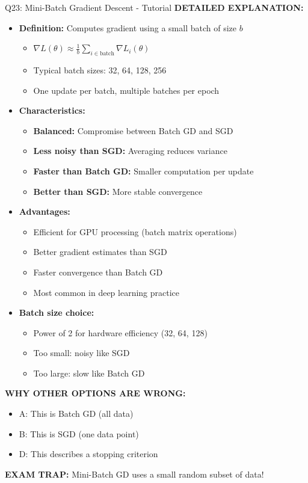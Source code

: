 \documentclass[8pt]{beamer}
\begin{document}
\begin{frame}{Q23: Mini-Batch Gradient Descent - Tutorial}
		\vspace{0.05cm}
		\textbf{DETAILED EXPLANATION:}
		\begin{itemize}
			\item \textbf{Definition:} Computes gradient using a small batch of size $b$
			\begin{itemize}
				\item $\nabla L(\theta) \approx \frac{1}{b}\sum_{i \in \text{batch}} \nabla L_i(\theta)$
				\item Typical batch sizes: 32, 64, 128, 256
				\item One update per batch, multiple batches per epoch
			\end{itemize}
			\item \textbf{Characteristics:}
			\begin{itemize}
				\item \textbf{Balanced:} Compromise between Batch GD and SGD
				\item \textbf{Less noisy than SGD:} Averaging reduces variance
				\item \textbf{Faster than Batch GD:} Smaller computation per update
				\item \textbf{Better than SGD:} More stable convergence
			\end{itemize}
			\item \textbf{Advantages:}
			\begin{itemize}
				\item Efficient for GPU processing (batch matrix operations)
				\item Better gradient estimates than SGD
				\item Faster convergence than Batch GD
				\item Most common in deep learning practice
			\end{itemize}
			\item \textbf{Batch size choice:}
			\begin{itemize}
				\item Power of 2 for hardware efficiency (32, 64, 128)
				\item Too small: noisy like SGD
				\item Too large: slow like Batch GD
			\end{itemize}
		\end{itemize}
		
		\vspace{0.05cm}
		\textcolor{myred}{\textbf{WHY OTHER OPTIONS ARE WRONG:}}
		\begin{itemize}
			\item \textcolor{myred}{A:} This is Batch GD (all data)
			\item \textcolor{myred}{B:} This is SGD (one data point)
			\item \textcolor{myred}{D:} This describes a stopping criterion
		\end{itemize}
		
		\textcolor{myred}{\textbf{EXAM TRAP:}} Mini-Batch GD uses a \textcolor{myblue}{small random subset} of data!
	\end{frame}
	
\end{document}
